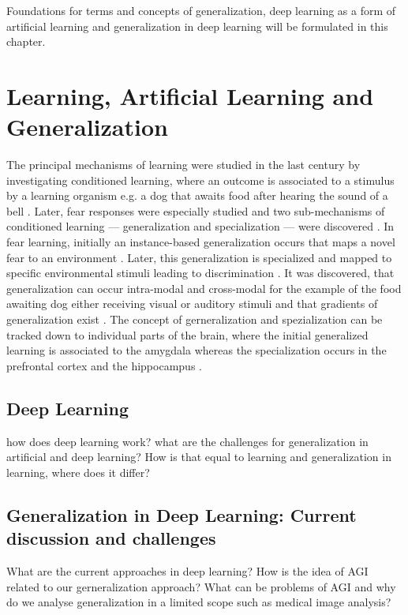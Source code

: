 Foundations for terms and concepts of generalization, deep learning as a form of artificial learning and generalization in deep learning will be formulated in this chapter.

\section{Learning, Artificial Learning and Generalization}

    The principal mechanisms of learning were studied in the last century by investigating conditioned learning, where an outcome is associated to a stimulus by a learning organism e.g. a dog that awaits food after hearing the sound of a bell \citep{pavlov1928conditioned, pavlov2010conditioned, banich2011generalization}. Later, fear responses were especially studied and two sub-mechanisms of conditioned learning --- generalization and specialization --- were discovered \citep{xx}.
    In fear learning, initially an instance-based generalization occurs that maps a novel fear to an environment \citep{banich2011generalization}. Later, this generalization is specialized and mapped to specific environmental stimuli leading to discrimination \citep{banich2011generalization}.
    It was discovered, that generalization can occur intra-modal and cross-modal for the example of the food awaiting dog either receiving visual or auditory stimuli \citep{pavlov1928conditioned} and that gradients of generalization exist \citep{guttman1956discriminability}.
    The concept of gerneralization and spezialization can be tracked down to individual parts of the brain, where the initial generalized learning is associated to the amygdala whereas the specialization occurs in the prefrontal cortex and the hippocampus \citep{banich2011generalization}.

    \subsection{Deep Learning}
        how does deep learning work?
        what are the challenges for generalization in artificial and deep learning?
        How is that equal to learning and generalization in learning, where does it differ?

    \subsection{Generalization in Deep Learning: Current discussion and challenges}
        What are the current approaches in deep learning? How is the idea of AGI related to our gerneralization approach? What can be problems of AGI and why do we analyse generalization in a limited scope such as medical image analysis?



